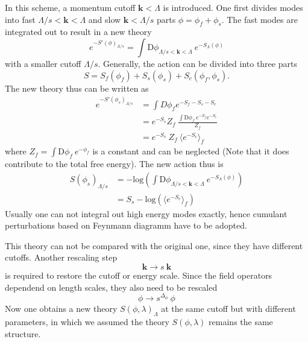 \documentclass[submission, PhysLectNotes]{SciPost}
\begin{document}
In this scheme, a momentum cutoff $\boldsymbol{k}<\Lambda$ is introduced. One first divides modes into fast $\Lambda/s<\boldsymbol{k}<\Lambda$ and slow $\boldsymbol{k}<\Lambda/s$ parts $\phi = \phi_f +\phi_s$. The fast modes are integrated out to result in a new theory 
\begin{equation}
    e^{-S'(\phi)_{\Lambda/s}} = \int \mathrm{D}\phi_{\Lambda/s<\boldsymbol{k}<\Lambda} \ e^{-S_{\Lambda}(\phi)}
\end{equation}
with a smaller cutoff $\Lambda/s$. Generally, the action can be divided into three parts
\begin{equation}
S = S_f(\phi_f) + S_s(\phi_s) + S_c(\phi_f,\phi_s).
\end{equation}
The new theory thus can be written as 
\begin{equation}
\begin{aligned}
    e^{-S'(\phi_s)_{\Lambda/s}} &= \int D\phi_f e^{-S_f - S_s - S_c} \\
    &= e^{-S_s} Z_f \ \frac{\int \mathrm{D}\phi_f \ e^{-S_f} e^{-S_c}} {Z_f} \\
    &= e^{-S_s}\ Z_f \ \langle e^{-S_c} \rangle_f
\end{aligned}
\end{equation}
where $ Z_f = \int \mathrm{D}\phi_f \ e^{-\phi_f}$ is a constant and can be neglected (Note that it does contribute to the total free energy). The new action thus is 
\begin{equation}
\begin{aligned}
S(\phi_s)_{\Lambda/s} &= -\mathrm{log} \left( \int \mathrm{D}\phi_{\Lambda/s<\boldsymbol{k}<\Lambda} \ e^{-S_{\Lambda}(\phi)} \right) \\
&= S_s - \mathrm{log} \left(\langle e^{-S_c} \rangle_f\right)
\end{aligned}
\end{equation}
Usually one can not integral out high energy modes exactly, hence cumulant perturbations based on Feynmann diagramm have to be adopted. 

This theory can not be compared with the original one, since they have different cutoffs. Another rescaling step 
\begin{equation}
    \boldsymbol{k} \rightarrow s\ \boldsymbol{k}
\end{equation}
is required to restore the cutoff or energy scale. Since the field operators dependend on length scales, they also need to be rescaled 
\begin{equation}
     \phi \rightarrow s^{\Delta_\phi}\ \phi
\end{equation}
Now one obtains a new theory $S(\phi,\lambda)_\Lambda$ at the same cutoff but with different parameters, in which we assumed the theory $S(\phi,\lambda)$ remains the same structure. 
\end{document}

